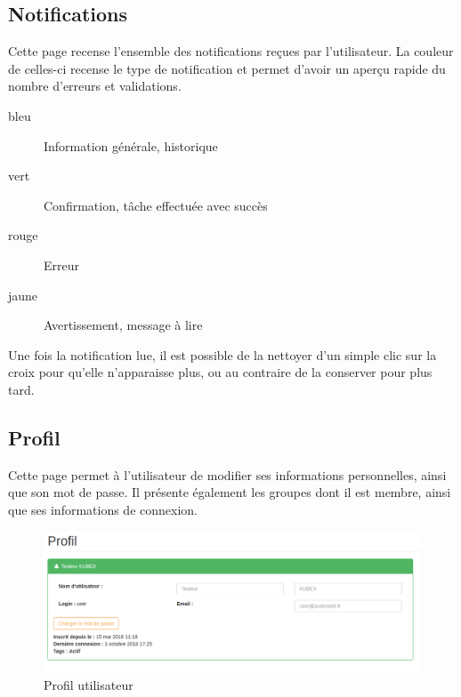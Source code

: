\documentclass[a4paper]{report}
\begin{document}
\subsection{Notifications}
\label{subsec:notifications}

Cette page recense l'ensemble des notifications reçues par l'utilisateur. La couleur de celles-ci recense le type de notification et permet d'avoir un aperçu rapide du nombre d'erreurs et validations.

\begin{description}
	\item[bleu] Information générale, historique
	\item[vert] Confirmation, tâche effectuée avec succès
	\item[rouge] Erreur
	\item[jaune] Avertissement, message à lire
\end{description}

Une fois la notification lue, il est possible de la nettoyer d'un simple clic sur la croix pour qu'elle n'apparaisse plus, ou au contraire de la conserver pour plus tard.
\newpage
\subsection{Profil}
\label{subsec:profil}

Cette page permet à l'utilisateur de modifier ses informations personnelles, ainsi que son mot de passe. Il présente également les groupes dont il est membre, ainsi que ses informations de connexion.

\begin{figure}[h!]
	\includegraphics[width=\textwidth]{images/profil.png}
	\caption{\label{fig:profil} Profil utilisateur}
\end{figure}


\end{document}
